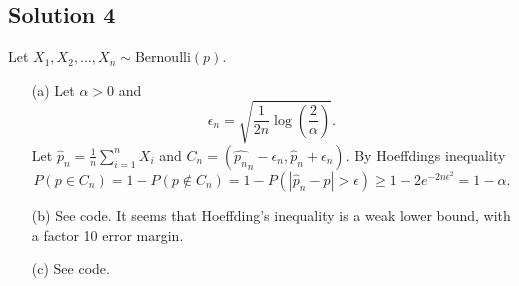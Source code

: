 \subsection*{Solution 4}

Let $X_1, X_2, ..., X_n \sim \mathrm{Bernoulli}(p)$.

\begin{itemize}
\item[(a)] Let $\alpha > 0$ and
\begin{equation*}
\epsilon_n = \sqrt{\frac{1}{2n} \log\left(\frac{2}{\alpha}\right)}.
\end{equation*}
Let $\hat{p}_n = \frac{1}{n}\sum_{i=1}^n X_i$ and $C_n = (\hat{p_n}_n - \epsilon_n, \hat{p}_n + \epsilon_n)$.
By Hoeffdings inequality
\begin{equation*}
P(p \in C_n) = 1 - P(p \notin C_n)
    = 1 - P(|\hat{p}_n - p| > \epsilon)
    \geq 1 - 2e^{-2n\epsilon^2}
    = 1 - \alpha.
\end{equation*}
\item[(b)] See code. It seems that Hoeffding's inequality is a weak lower bound, with a factor 10 error margin.
\item[(c)] See code.
\end{itemize}

